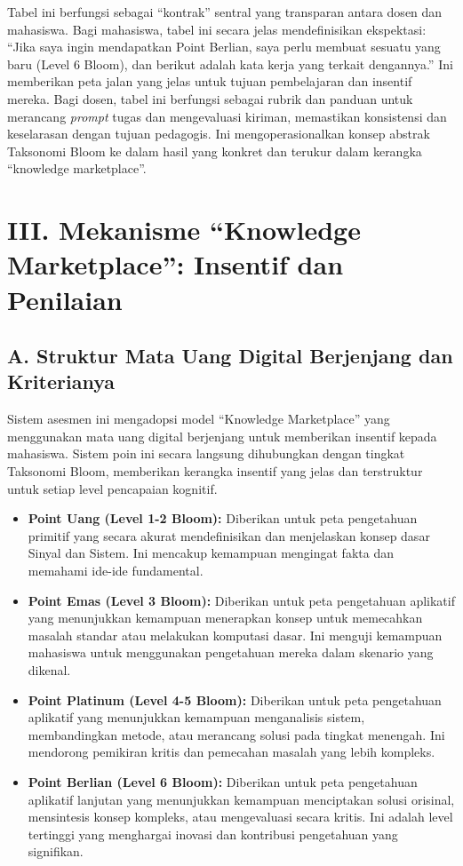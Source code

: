 \documentclass[
  letterpaper,
  DIV=11,
  numbers=noendperiod]{scrreprt}
\begin{document}
Tabel ini berfungsi sebagai ``kontrak'' sentral yang transparan antara
dosen dan mahasiswa. Bagi mahasiswa, tabel ini secara jelas
mendefinisikan ekspektasi: ``Jika saya ingin mendapatkan Point Berlian,
saya perlu membuat sesuatu yang baru (Level 6 Bloom), dan berikut adalah
kata kerja yang terkait dengannya.'' Ini memberikan peta jalan yang
jelas untuk tujuan pembelajaran dan insentif mereka. Bagi dosen, tabel
ini berfungsi sebagai rubrik dan panduan untuk merancang \emph{prompt}
tugas dan mengevaluasi kiriman, memastikan konsistensi dan keselarasan
dengan tujuan pedagogis. Ini mengoperasionalkan konsep abstrak Taksonomi
Bloom ke dalam hasil yang konkret dan terukur dalam kerangka ``knowledge
marketplace''.

\section{III. Mekanisme ``Knowledge Marketplace'': Insentif dan
Penilaian}\label{iii.-mekanisme-knowledge-marketplace-insentif-dan-penilaian}

\subsection{A. Struktur Mata Uang Digital Berjenjang dan
Kriterianya}\label{a.-struktur-mata-uang-digital-berjenjang-dan-kriterianya}

Sistem asesmen ini mengadopsi model ``Knowledge Marketplace'' yang
menggunakan mata uang digital berjenjang untuk memberikan insentif
kepada mahasiswa. Sistem poin ini secara langsung dihubungkan dengan
tingkat Taksonomi Bloom, memberikan kerangka insentif yang jelas dan
terstruktur untuk setiap level pencapaian kognitif.

\begin{itemize}
\item
  \textbf{Point Uang (Level 1-2 Bloom):} Diberikan untuk peta
  pengetahuan primitif yang secara akurat mendefinisikan dan menjelaskan
  konsep dasar Sinyal dan Sistem. Ini mencakup kemampuan mengingat fakta
  dan memahami ide-ide fundamental.
\item
  \textbf{Point Emas (Level 3 Bloom):} Diberikan untuk peta pengetahuan
  aplikatif yang menunjukkan kemampuan menerapkan konsep untuk
  memecahkan masalah standar atau melakukan komputasi dasar. Ini menguji
  kemampuan mahasiswa untuk menggunakan pengetahuan mereka dalam
  skenario yang dikenal.
\item
  \textbf{Point Platinum (Level 4-5 Bloom):} Diberikan untuk peta
  pengetahuan aplikatif yang menunjukkan kemampuan menganalisis sistem,
  membandingkan metode, atau merancang solusi pada tingkat menengah. Ini
  mendorong pemikiran kritis dan pemecahan masalah yang lebih kompleks.
\item
  \textbf{Point Berlian (Level 6 Bloom):} Diberikan untuk peta
  pengetahuan aplikatif lanjutan yang menunjukkan kemampuan menciptakan
  solusi orisinal, mensintesis konsep kompleks, atau mengevaluasi secara
  kritis. Ini adalah level tertinggi yang menghargai inovasi dan
  kontribusi pengetahuan yang signifikan.
\end{itemize}
\end{document}
